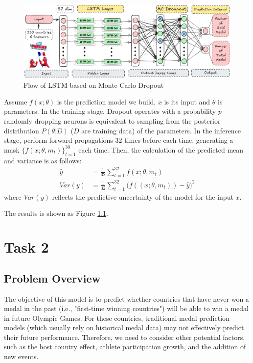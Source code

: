 \documentclass{mcmthesis}
\begin{document}
	\begin{figure}
		\centering
		\includegraphics[width=1\linewidth]{fig/LSTM-MCD.png}
		\caption{Flow of LSTM based on Monte Carlo Dropout}
		\label{fig:lstm-mcd}
	\end{figure}
	
	
	Assume $f(x;\theta)$ is the prediction model we build, $x$ is its input and $\theta$ is parameters. In the training stage, Dropout operates with a probability $p$
	randomly dropping neurons is equivalent to sampling from the posterior distribution $P(\theta|D)$ ($D$ are training data) of the parameters. In the inference stage, perform forward propagations $32$ times before each time, generating a mask $\{f(x;\theta,m_t)\}_{t=1}^{30}$ each time. Then, the calculation of the predicted mean and variance is as follows:
	\begin{align*}
		\hat{y}&=\frac{1}{32} \sum_{t=1}^{32} f(x;\theta,m_t) \\
		Var(y) &=\frac{1}{32} \sum_{t=1}^{32} \big( f((x;\theta,m_t)) - \hat{y} \big)^2
	\end{align*}
	where $Var(y)$ reflects the predictive uncertainty of the model for the input $x$.
	
	The results is shown as Figure \ref{}.
	
	
	
	
	
	
	\section{Task 2}
	
	
	\subsection{Problem Overview}
	The objective of this model is to predict whether countries that have never won a medal in the past (i.e., "first-time winning countries") will be able to win a medal in future Olympic Games. For these countries, traditional medal prediction models (which usually rely on historical medal data) may not effectively predict their future performance. Therefore, we need to consider other potential factors, such as the host country effect, athlete participation growth, and the addition of new events.
	
\end{document}
